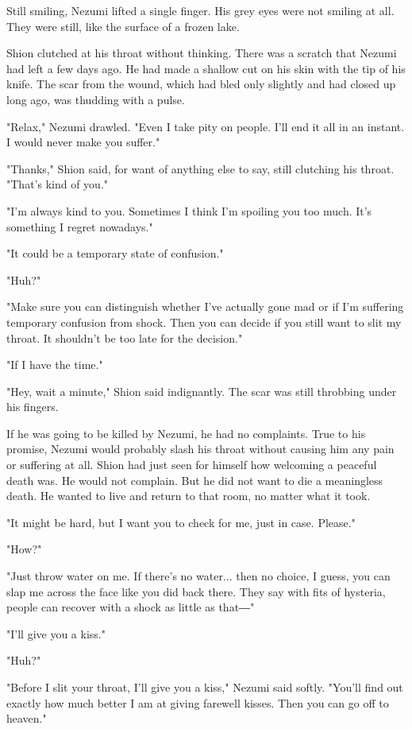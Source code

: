 Still smiling, Nezumi lifted a single finger. His grey eyes were not
smiling at all. They were still, like the surface of a frozen lake.

Shion clutched at his throat without thinking. There was a scratch that
Nezumi had left a few days ago. He had made a shallow cut on his skin
with the tip of his knife. The scar from the wound, which had bled only
slightly and had closed up long ago, was thudding with a pulse.

"Relax," Nezumi drawled. "Even I take pity on people. I'll end it all in
an instant. I would never make you suffer."

"Thanks," Shion said, for want of anything else to say, still clutching
his throat. "That's kind of you."

"I'm always kind to you. Sometimes I think I'm spoiling you too much.
It's something I regret nowadays."

"It could be a temporary state of confusion."

"Huh?"

"Make sure you can distinguish whether I've actually gone mad or if I'm
suffering temporary confusion from shock. Then you can decide if you
still want to slit my throat. It shouldn't be too late for the
decision."

"If I have the time."

"Hey, wait a minute," Shion said indignantly. The scar was still
throbbing under his fingers.

If he was going to be killed by Nezumi, he had no complaints. True to
his promise, Nezumi would probably slash his throat without causing him
any pain or suffering at all. Shion had just seen for himself how
welcoming a peaceful death was. He would not complain. But he did not
want to die a meaningless death. He wanted to live and return to that
room, no matter what it took.

"It might be hard, but I want you to check for me, just in case.
Please."

"How?"

"Just throw water on me. If there's no water... then no choice, I guess,
you can slap me across the face like you did back there. They say with
fits of hysteria, people can recover with a shock as little as that―"

"I'll give you a kiss."

"Huh?"

"Before I slit your throat, I'll give you a kiss," Nezumi said softly.
"You'll find out exactly how much better I am at giving farewell kisses.
Then you can go off to heaven."


